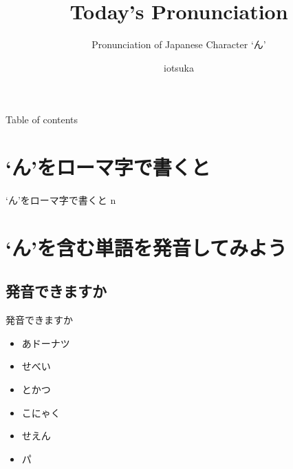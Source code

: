 \documentclass[aspectratio=169,xcolor={dvipsnames,table}]{beamer}
\title{Today's Pronunciation}
\subtitle{Pronunciation of Japanese Character `ん'}
\date[]{\mytoday}
\author{iotsuka}
\institute{Eduop ちば}
\begin{document}
\maketitle

   \begin{frame}[toc]{Table of contents}%
      \tableofcontents%
   \end{frame}

\section{`ん'をローマ字で書くと}
\begin{frame}[plain]{`ん'をローマ字で書くと}
\centering
\Huge n

\end{frame}
\section{`ん'を含む単語を発音してみよう}
\subsection{発音できますか}
\begin{frame}[plain]{発音できますか}
 \begin{itemize}
  \item あドーナツ
  \item せべい
  \item とかつ
  \item こにゃく
  \item せえん
  \item パ
 \end{itemize}
\end{frame}
\end{document}
